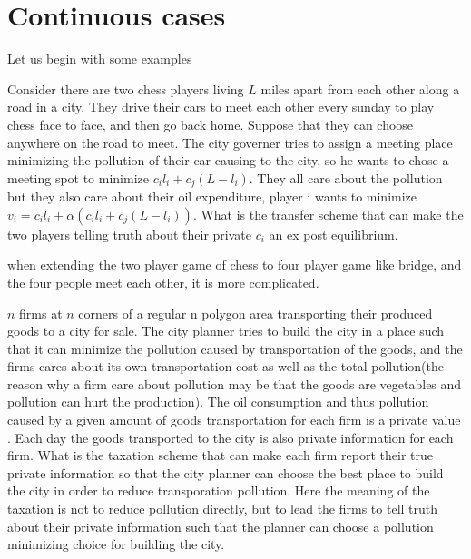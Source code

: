 \section{Continuous cases}
Let us begin with some examples
\begin{example}
 Consider there are two chess players living $L$ miles apart from each other along a road in a city. They drive their cars to meet
 each other every sunday to play chess face to face, and then go back home. Suppose that they can choose anywhere on the road to meet.
The city governer tries to assign a meeting place minimizing the pollution of their car causing to the city, so he wants to
chose a meeting spot to minimize $c_il_i+c_j(L-l_i)$. They all care about the 
 pollution but they also care about their oil expenditure, player i wants to minimize $v_i= c_il_i+ \alpha(c_il_i+c_j(L-l_i))$. What
 is the transfer scheme that can make the two players telling truth about their private $c_i$ an ex post equilibrium.
\end{example}
when extending the two player game of chess to four player game like bridge, and the four people meet each other,
it is more complicated. 
\begin{example}
 $n$ firms at $n$ corners of a regular n polygon area transporting their produced goods to a city for sale.
The city planner tries to build the city in a place such that it can minimize the pollution caused by transportation of the goods, 
and the firms cares about its own transportation cost as well as the total pollution(the reason why a firm care about pollution
may be that the goods are vegetables and pollution can hurt the production). The oil consumption and thus pollution caused 
by a given amount of goods transportation for each firm is a private value . Each day the goods transported to the city is also
private information for each firm. What is the taxation scheme that can make each firm report their true private information so that the city 
planner can choose the best place to build the city in order to reduce transporation pollution. Here the meaning of the taxation is not
to reduce pollution directly, but to lead the firms to tell truth about their private information such that the planner can choose a
pollution minimizing choice for building the city.
\end{example}

